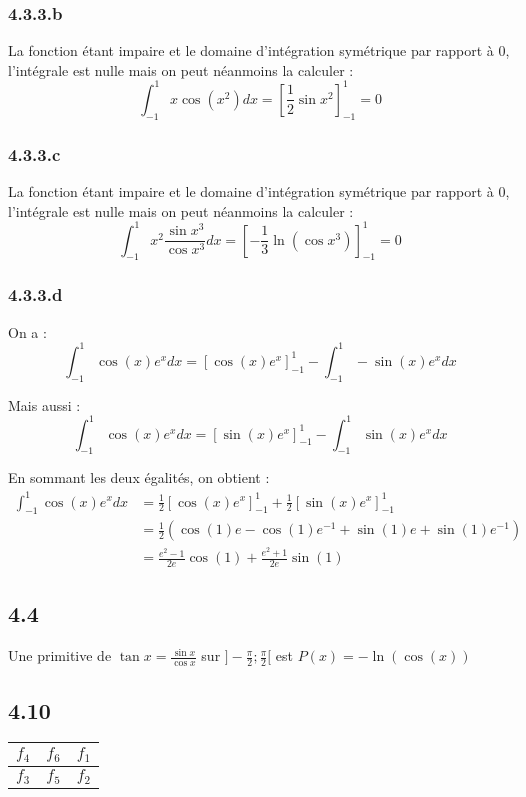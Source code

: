 \documentclass[a4paper,10pt]{report}
\begin{document}
\subsubsection*{4.3.3.b}
La fonction étant impaire et le domaine d'intégration symétrique par rapport à $0$, l'intégrale
est nulle mais on peut néanmoins la calculer :
\begin{displaymath}
	\int_{-1}^1 x\cos(x^2)dx = \left[ \frac{1}{2}\sin x^2 \right]_{-1}^1 = 0
\end{displaymath}

\subsubsection*{4.3.3.c}
La fonction étant impaire et le domaine d'intégration symétrique par rapport à $0$, l'intégrale
est nulle mais on peut néanmoins la calculer :
\begin{displaymath}
	\int_{-1}^1 x^2 \frac{\sin x^3}{\cos x^3} dx = \left[ -\frac{1}{3}\ln(\cos x^3) \right]_{-1}^1= 0
\end{displaymath}

\subsubsection*{4.3.3.d}

On a :
\begin{displaymath}
	\int_{-1}^1 \cos(x)e^x dx = \left[ \cos(x)e^x \right]_{-1}^1 - \int_{-1}^1 -\sin(x)e^x dx
\end{displaymath}

Mais aussi :
\begin{displaymath}
	\int_{-1}^1 \cos(x)e^x dx = \left[ \sin(x)e^x \right]_{-1}^1 - \int_{-1}^1 \sin(x)e^x dx
\end{displaymath}

En sommant les deux égalités, on obtient :
\begin{equation*}
	\begin{split}
	\int_{-1}^1 \cos(x)e^x dx &= \frac{1}{2}\left[ \cos(x)e^x \right]_{-1}^1 +  \frac{1}{2}\left[ \sin(x)e^x \right]_{-1}^1 \\
                              &= \frac{1}{2} (\cos(1)e - \cos(1)e^{-1} + \sin(1) e + \sin(1)e^{-1}) \\
                              &= \frac{e^2-1}{2e}\cos(1) + \frac{e^2+1}{2e} \sin(1)
	\end{split}
\end{equation*}

\subsection*{4.4}

Une primitive de $\tan x = \frac{\sin x}{\cos x}$ sur $]-\frac{\pi}{2} ; \frac{\pi}{2}[$ est $P(x)=-\ln(\cos(x))$

\subsection*{4.10}

\begin{tabular}{|c|c|c|}
	\hline
	$f_4$ & $f_6$ & $f_1$ \\
	\hline
	$f_3$ & $f_5$ & $f_2$  \\
	\hline
\end{tabular}
\end{document}
